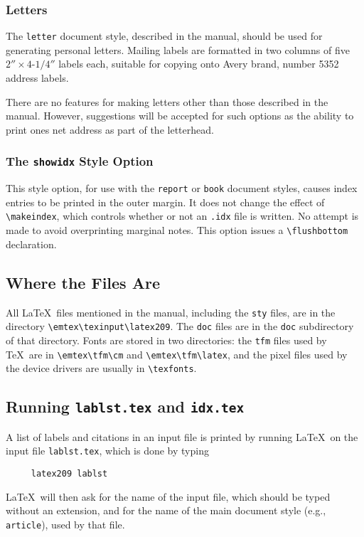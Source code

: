  
\subsubsection{Letters} \label{sec:letters}
 
The \mbox{\tt letter} document style, described in the manual, should
be used for generating personal letters.
Mailing labels are formatted in two columns of five
$2''\times\mbox{4-1/4}''$ labels each, suitable for copying onto Avery
brand, number 5352 address labels.
 
There are no features for making letters other than those described in
the manual.  However, suggestions will be accepted for such options as
the ability to print ones net address as part of the letterhead.
 
\subsubsection{The {\tt showidx} Style Option}
 
This style option, for use with the {\tt report} or {\tt book} document
styles, causes index entries to be printed in the outer margin.  It
does not change the effect of \verb|\makeindex|, which controls
whether or not an {\tt .idx} file is written.  No attempt is made to
avoid overprinting marginal notes.  This option issues a 
\verb|\flushbottom| declaration.
 
\subsection{Where the Files Are}
 
%
 
All \LaTeX\ files mentioned in the manual, including the {\tt sty}
files, are in the directory \verb|\emtex\texinput\latex209|.  The
{\tt doc} files are in the \verb|doc| subdirectory of that directory.
Fonts are stored in two directories: the {\tt tfm} files used by \TeX\ 
are in \verb|\emtex\tfm\cm| and \verb|\emtex\tfm\latex|, and the pixel
files used by the device drivers are usually in \verb|\texfonts|.
 
\subsection{Running {\tt lablst.tex} and {\tt idx.tex}}
 
A list of labels and citations in an input file is printed
by running \LaTeX\ on the input file \mbox{\tt lablst.tex},
which is done by typing
\begin{verbatim}
     latex209 lablst
\end{verbatim}
\LaTeX\ will then ask for the name of the input file, which should be
typed without an extension, and for the name of the main document style
(e.g., \mbox{\tt article}), used by that file.
 
